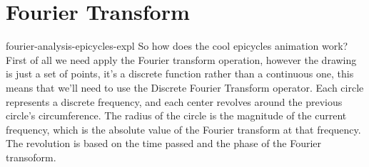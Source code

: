 \documentclass[preview]{standalone}
\begin{document}
\genpage

\section{Fourier Transform}

\begin{snippet}{fourier-analysis-epicycles-expl}
    So how does the cool epicycles animation work?
    First of all we need apply the Fourier transform operation, however
    the drawing is just a set of points, it's a discrete function rather
    than a continuous one, this means that we'll need to use the
    Discrete Fourier Transform operator.
    Each circle represents a discrete frequency, and each center revolves
    around the previous circle's circumference. The radius of the circle
    is the magnitude of the current frequency, which is the absolute value
    of the Fourier transform at that frequency. The revolution is based
    on the time passed and the phase of the Fourier transoform.
\end{snippet}

\end{document}
